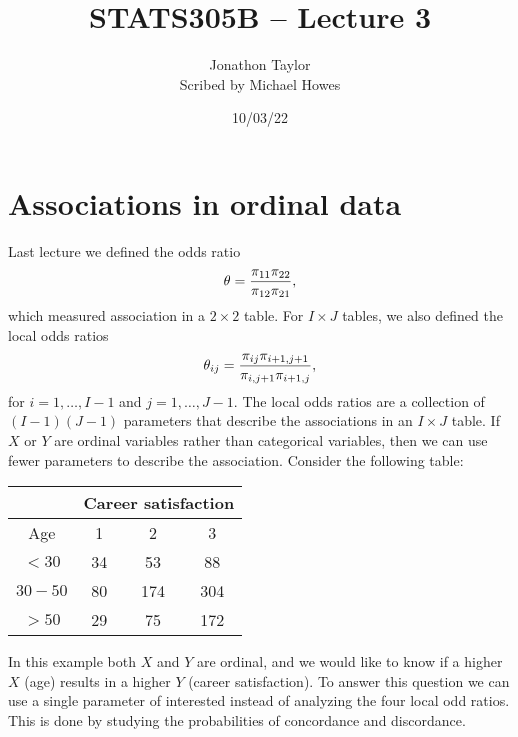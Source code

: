 




\title{STATS305B -- Lecture 3}
\author{Jonathon Taylor\\ Scribed by Michael Howes}
\date{10/03/22}

\pagestyle{fancy}
\fancyhf{}


\maketitle
\tableofcontents
\section{Associations in ordinal data}
Last lecture we defined the odds ratio
\[{\theta} = \frac{\pi_{11}\pi_{22}}{\pi_{12}\pi_{21}},\]
which measured association in a $2\times 2$ table. For $I \times J$ tables, we also defined the local odds ratios
\[{\theta}_{ij} =  \frac{\pi_{ij}\pi_{i+1,j+1}}{\pi_{i,j+1}\pi_{i+1,j}}, \]
for $i = 1,\ldots,I-1$ and $j=1,\ldots,J-1$. The local odds ratios are a collection of $(I-1)(J-1)$ parameters that describe the associations in an $I \times J$ table. If $X$ or $Y$ are ordinal variables rather than categorical variables, then we can use fewer parameters to describe the association. Consider the following table:
\begin{center}
    \begin{tabular}{c|ccc}
        &\multicolumn{3}{c}{Career satisfaction}\\
        \hline 
        Age&1&2&3\\
        \hline
        $<30$&34&53&88\\
        $30-50$&80&174&304\\
        $>50$&29&75&172
    \end{tabular}
\end{center}
In this example both $X$ and $Y$ are ordinal, and we would like to know if a higher $X$ (age) results in a higher $Y$ (career satisfaction). To answer this question we can use a single parameter of interested instead of analyzing the four local odd ratios. This is done by studying the probabilities of concordance and discordance. 

